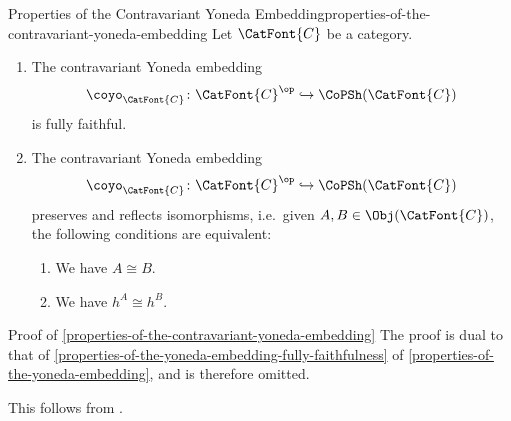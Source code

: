 \begin{proposition}{Properties of the Contravariant Yoneda Embedding}{properties-of-the-contravariant-yoneda-embedding}%
    Let $\CatFont{C}$ be a category.
    \begin{enumerate}
        \item\label{properties-of-the-contravariant-yoneda-embedding-fully-faithfulness}The contravariant Yoneda embedding
            \[
                \coyo_{\CatFont{C}}%
                \colon%
                \CatFont{C}^{\op}%
                \hookrightarrow%
                \CoPSh(\CatFont{C})%
            \]%
            is fully faithful.
        \item\label{properties-of-the-contravariant-yoneda-embedding-preservation-and-reflection-of-isomorphisms}The contravariant Yoneda embedding
            \[
                \coyo_{\CatFont{C}}%
                \colon%
                \CatFont{C}^{\op}%
                \hookrightarrow%
                \CoPSh(\CatFont{C})%
            \]%
            preserves and reflects isomorphisms, i.e.\ given $A,B\in\Obj(\CatFont{C})$, the following conditions are equivalent:
            \begin{enumerate}
                \item\label{properties-of-the-contravariant-yoneda-embedding-preservation-and-reflection-of-isomorphisms-1}We have $A\cong B$.
                \item\label{properties-of-the-contravariant-yoneda-embedding-preservation-and-reflection-of-isomorphisms-2}We have $h^{A}\cong h^{B}$.
            \end{enumerate}
    \end{enumerate}
\end{proposition}
\begin{Proof}{Proof of \cref{properties-of-the-contravariant-yoneda-embedding}}%
    The proof is dual to that of \cref{properties-of-the-yoneda-embedding-fully-faithfulness} of \cref{properties-of-the-yoneda-embedding}, and is therefore omitted.

    This follows from .
\end{Proof}
